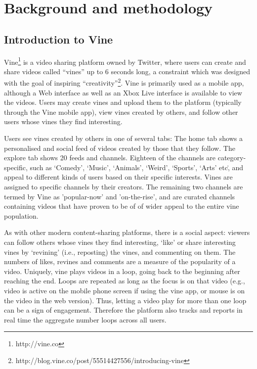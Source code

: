 \section{Background and methodology}
\subsection{Introduction to Vine}

Vine\footnote{http://vine.co} is a video sharing platform owned by Twitter, where users can create and share videos called ``vines'' up to 6 seconds long, a constraint which was designed with the goal of inspiring ``creativity''\footnote{http://blog.vine.co/post/55514427556/introducing-vine}. Vine is primarily used as a mobile app, although a Web interface as well as an Xbox Live interface is available to view the videos. Users may create vines and upload them to the platform (typically through the Vine mobile app), view vines created by others, and follow other users whose vines they find interesting. 

Users see vines created by others in one of several tabs: The home tab shows a personalised and social feed of videos created by those that they follow. The explore tab shows 20 feeds and channels. Eighteen of the channels are category-specific, such as `Comedy', `Music', `Animals', `Weird', `Sports', `Arts' etc\., and appeal to different kinds of users based on their specific interests. Vines are  assigned to specific channels by their creators. The remaining two channels are termed by Vine as 'popular-now' and 'on-the-rise',  and are curated channels containing videos that have proven to be of of wider appeal to the entire vine population. 

As with other modern content-sharing platforms, there is a social aspect: viewers can follow others whose vines they find interesting, `like' or share interesting vines by `revining' (i.e., reposting) the vines, and commenting on them. The numbers of likes, revines and comments are a measure of the popularity of a video. Uniquely, vine plays videos in a loop, going back to the beginning after reaching the end. Loops are repeated as long as the focus is on that video (e.g., video is active on the mobile phone screen if using the vine app, or mouse is on the video in the web version). Thus, letting a video play for more than one loop can be a sign of engagement. Therefore the platform also tracks and reports in real time the aggregate number loops across all users. 


